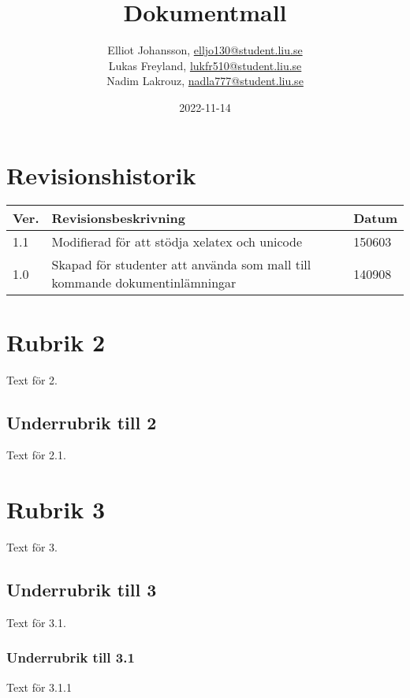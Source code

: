 \documentclass{TDP005mall}
\author{Elliot Johansson, \url{elljo130@student.liu.se}\\
  Lukas Freyland, \url{lukfr510@student.liu.se}\\
  Nadim Lakrouz, \url{nadla777@student.liu.se}}
\title{Dokumentmall}
\date{2022-11-14}
\begin{document}
\projectpage
\section{Revisionshistorik}
\begin{table}[!h]
\begin{tabularx}{\linewidth}{|l|X|l|}
\hline
Ver. & Revisionsbeskrivning & Datum \\\hline
1.1 & Modifierad för att stödja xelatex och unicode & 150603 \\\hline
1.0 & Skapad för studenter att använda som mall till
kommande dokumentinlämningar & 140908 \\\hline
\end{tabularx}
\end{table}


\section{Rubrik 2}
Text för 2.

\subsection{Underrubrik till 2}
Text för 2.1.

\section{Rubrik 3}
Text för 3.

\subsection{Underrubrik till 3}
Text för 3.1.

\subsubsection{Underrubrik till 3.1}
Text för 3.1.1
\end{document}
